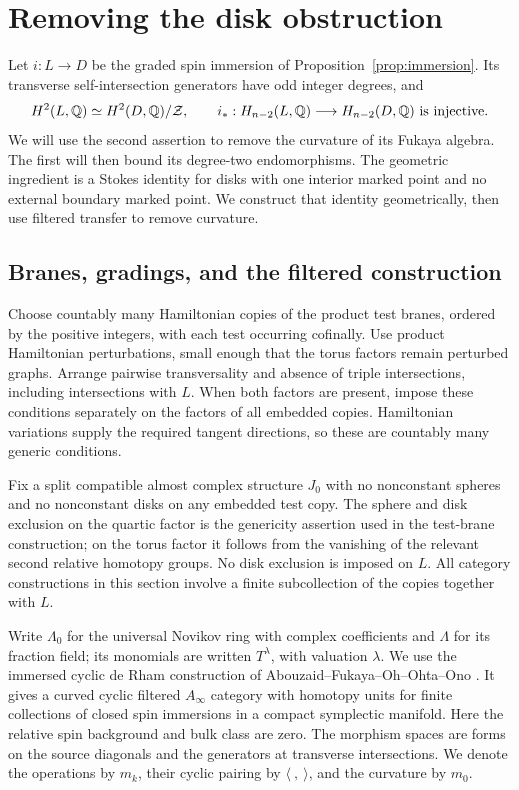 \section{Removing the disk obstruction}\label{sec:curvature}

Let $i:L\to D$ be the graded spin immersion of
Proposition~\ref{prop:immersion}.  Its transverse self-intersection
generators have odd integer degrees, and
\begin{equation}\label{curv:topological-input}
 H^2(L,\mathbb Q)\simeq H^2(D,\mathbb Q)/\mathcal Z,
 \qquad
 i_*:H_{n-2}(L,\mathbb Q)\longrightarrow H_{n-2}(D,\mathbb Q)
 \text{ is injective}.
\end{equation}
We will use the second assertion to remove the curvature of its
Fukaya algebra.  The first will then bound its degree-two endomorphisms.
The geometric ingredient is a Stokes identity for disks with one
interior marked point and no external boundary marked point.  We
construct that identity geometrically, then use filtered transfer to
remove curvature.

\subsection{Branes, gradings, and the filtered construction}

Choose countably many Hamiltonian copies of the product test branes,
ordered by the positive integers, with each test occurring cofinally.
Use product Hamiltonian perturbations, small enough that the torus
factors remain perturbed graphs.  Arrange pairwise transversality and
absence of triple intersections, including intersections with $L$.
When both factors are present, impose these conditions separately on
the factors of all embedded copies.  Hamiltonian variations supply the
required tangent directions, so these are countably many generic
conditions.

Fix a split compatible almost complex structure $J_0$ with no
nonconstant spheres and no nonconstant disks on any embedded test
copy.  The sphere and disk exclusion on the quartic factor is the
genericity assertion used in the test-brane construction; on the torus
factor it follows from the vanishing of the relevant second relative
homotopy groups.  No disk exclusion is imposed on $L$.  All category
constructions in this section involve a finite subcollection of the
copies together with $L$.

Write $\Lambda_0$ for the universal Novikov ring with complex
coefficients and $\Lambda$ for its fraction field; its monomials are
written $T^\lambda$, with valuation $\lambda$.  We use the immersed
cyclic de Rham construction of Abouzaid--Fukaya--Oh--Ohta--Ono
\cite[Theorems~9.3 and~9.6]{AFOOO2026}.  It gives a curved cyclic
filtered $A_\infty$ category with homotopy units for finite collections
of closed spin immersions in a compact symplectic manifold.  Here the
relative spin background and bulk class are zero.  The morphism spaces
are forms on the source diagonals and the generators at transverse
intersections.  We denote the operations by $m_k$, their cyclic pairing
by $\langle\ ,\ \rangle$, and the curvature by $m_0$.

